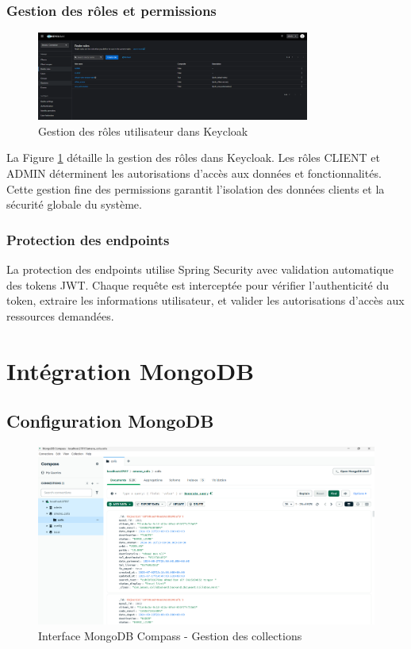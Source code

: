 \subsubsection{Gestion des rôles et permissions}

\begin{figure}[H]
\centering
\includegraphics[width=0.8\textwidth]{images/keycloak_roles.png}
\caption{Gestion des rôles utilisateur dans Keycloak}
\label{fig:keycloak_roles}
\end{figure}

La Figure \ref{fig:keycloak_roles} détaille la gestion des rôles dans Keycloak. Les rôles CLIENT et ADMIN déterminent les autorisations d'accès aux données et fonctionnalités. Cette gestion fine des permissions garantit l'isolation des données clients et la sécurité globale du système.

\subsubsection{Protection des endpoints}

La protection des endpoints utilise Spring Security avec validation automatique des tokens JWT. Chaque requête est interceptée pour vérifier l'authenticité du token, extraire les informations utilisateur, et valider les autorisations d'accès aux ressources demandées.

\section{Intégration MongoDB}

\subsection{Configuration MongoDB}

\begin{figure}[H]
\centering
\includegraphics[width=1.0\textwidth]{images/mongodb_compass.png}
\caption{Interface MongoDB Compass - Gestion des collections}
\label{fig:mongodb_compass}
\end{figure}

